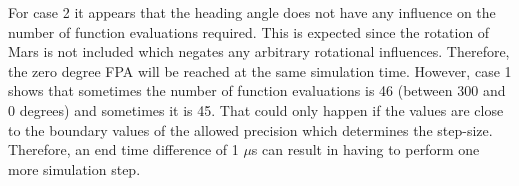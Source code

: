 \noindent
For case 2 it appears that the heading angle does not have any influence on the number of function evaluations required. This is expected since the rotation of Mars is not included which negates any arbitrary rotational influences. Therefore, the zero degree \ac{FPA} will be reached at the same simulation time. However, case 1 shows that sometimes the number of function evaluations is 46 (between 300 and 0 degrees) and sometimes it is 45. That could only happen if the values are close to the boundary values of the allowed precision which determines the step-size. Therefore, an end time difference of 1 $\mu$s can result in having to perform one more simulation step. 



\begin{figure}[H]
\centering
{} 

\end{figure}
